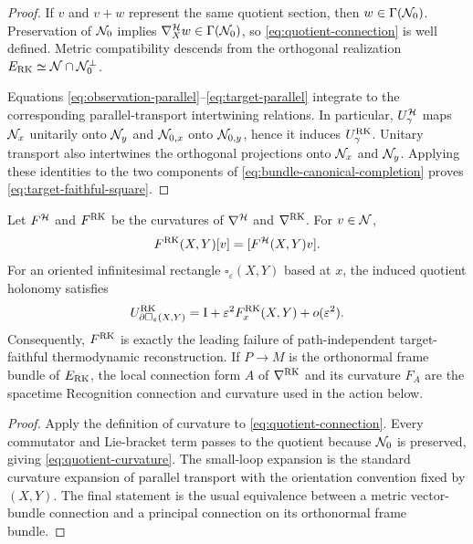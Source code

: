 \begin{proof}
If $v$ and $v+w$ represent the same quotient section, then $w\in\Gamma(\mathcal N_0)$.  Preservation of $\mathcal N_0$ implies $\nabla_X^{\mathcal H}w\in\Gamma(\mathcal N_0)$, so \eqref{eq:quotient-connection} is well defined.  Metric compatibility descends from the orthogonal realization $E_{\mathrm{RK}}\simeq\mathcal N\cap\mathcal N_0^\perp$.

Equations \eqref{eq:observation-parallel}--\eqref{eq:target-parallel} integrate to the corresponding parallel-transport intertwining relations.  In particular, $U_\gamma^{\mathcal H}$ maps $\mathcal N_x$ unitarily onto $\mathcal N_y$ and $\mathcal N_{0,x}$ onto $\mathcal N_{0,y}$, hence it induces $U_\gamma^{\mathrm{RK}}$.  Unitary transport also intertwines the orthogonal projections onto $\mathcal N_x$ and $\mathcal N_y$.  Applying these identities to the two components of \eqref{eq:bundle-canonical-completion} proves \eqref{eq:target-faithful-square}.
\end{proof}

\begin{theorem}
\label{thm:recognition-curvature-square-defect}
Let $F^{\mathcal H}$ and $F^{\mathrm{RK}}$ be the curvatures of $\nabla^{\mathcal H}$ and $\nabla^{\mathrm{RK}}$.  For $v\in\mathcal N$,
\begin{equation}
F^{\mathrm{RK}}(X,Y)[v]
=[F^{\mathcal H}(X,Y)v].
\label{eq:quotient-curvature}
\end{equation}
For an oriented infinitesimal rectangle $\square_\varepsilon(X,Y)$ based at $x$, the induced quotient holonomy satisfies
\begin{equation}
U^{\mathrm{RK}}_{\partial\square_\varepsilon(X,Y)}
=\mathrm I+\varepsilon^2F^{\mathrm{RK}}_x(X,Y)+o(\varepsilon^2).
\label{eq:small-loop-square-defect}
\end{equation}
Consequently, $F^{\mathrm{RK}}$ is exactly the leading failure of path-independent target-faithful thermodynamic reconstruction.  If $P\to M$ is the orthonormal frame bundle of $E_{\mathrm{RK}}$, the local connection form $A$ of $\nabla^{\mathrm{RK}}$ and its curvature $F_A$ are the spacetime Recognition connection and curvature used in the action below.
\end{theorem}

\begin{proof}
Apply the definition of curvature to \eqref{eq:quotient-connection}.  Every commutator and Lie-bracket term passes to the quotient because $\mathcal N_0$ is preserved, giving \eqref{eq:quotient-curvature}.  The small-loop expansion is the standard curvature expansion of parallel transport with the orientation convention fixed by $(X,Y)$.  The final statement is the usual equivalence between a metric vector-bundle connection and a principal connection on its orthonormal frame bundle.
\end{proof}

